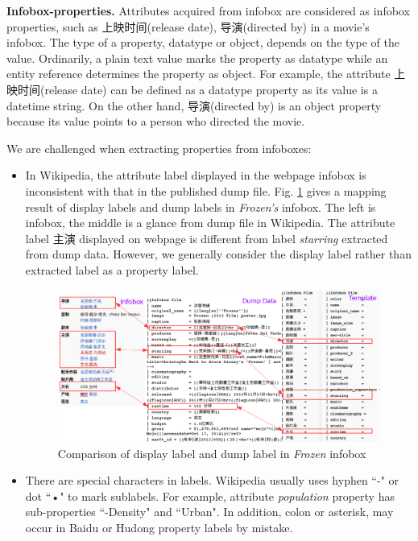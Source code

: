 \documentclass[runningheads,a4paper]{llncs}
\newcommand{\para}[1]{\vspace{0.1cm}\noindent\textbf{#1}}
\begin{document}
\para{Infobox-properties.} Attributes acquired from infobox are considered as infobox properties, such as 上映时间(release date), 导演(directed by) in a movie's infobox. The type of a property, datatype or object, depends on the type of the value. Ordinarily, a plain text value marks the property as datatype while an entity reference determines the property as object. For example, the attribute 上映时间(release date) can be defined as a datatype property as its value is a datetime string. On the other hand, 导演(directed by) is an object property because its value points to a person who directed the movie.

We are challenged when extracting properties from infoboxes:
\begin{itemize}
    \item In Wikipedia, the attribute label displayed in the webpage infobox is inconsistent with that in the published dump file. Fig. \ref{fig:infobox-template} gives a mapping result of display labels and dump labels in \emph{Frozen's} infobox. The left is infobox, the middle is a glance from dump file in Wikipedia. The attribute label 主演 displayed on webpage is different from label \emph{starring} extracted from dump data. However, we generally consider the display label rather than extracted label as a property label.
    \begin{figure}[ht]
        \centerline{\includegraphics[width=1\columnwidth]{fig/infobox-template}}
        \caption{Comparison of display label and dump label in \emph{Frozen} infobox}
        \label{fig:infobox-template}
    \end{figure}%
\item There are special characters in labels. Wikipedia usually uses hyphen ``-" or dot ``•" to mark sublabels. For example, attribute \emph{population} property has sub-properties ``-Density" and ``Urban". In addition, colon or asterisk, may occur in Baidu or Hudong property labels by mistake.
\end{itemize}
\end{document}
